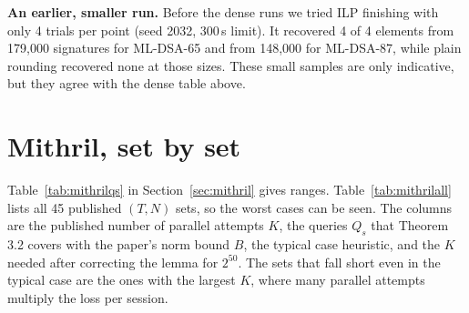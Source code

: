 \documentclass[10pt,conference,a4paper]{IEEEtran}
\begin{document}
\textbf{An earlier, smaller run.} Before the dense runs we tried ILP finishing with only 4 trials per point (seed 2032,
300\,s limit). It recovered 4 of 4 elements from 179{,}000 signatures for ML-DSA-65 and from 148{,}000 for ML-DSA-87, while
plain rounding recovered none at those sizes. These small samples are only indicative, but they agree with the dense table
above.

\section{Mithril, set by set}\label{app:mithril}
Table~\ref{tab:mithrilqs} in Section~\ref{sec:mithril} gives ranges. Table~\ref{tab:mithrilall} lists all 45 published
$(T,N)$ sets, so the worst cases can be seen. The columns are the published number of parallel attempts $K$, the queries
$Q_s$ that Theorem 3.2 covers with the paper's norm bound $B$, the typical case heuristic, and the $K$ needed after
correcting the lemma for $2^{50}$. The sets that fall short even in the typical case are the ones with the largest $K$,
where many parallel attempts multiply the loss per session.
\end{document}
